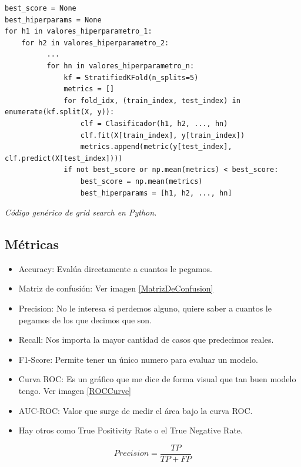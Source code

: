 \documentclass[titlepage,a4paper]{article}
\begin{document}
\begin{verbatim}
best_score = None
best_hiperparams = None
for h1 in valores_hiperparametro_1:
    for h2 in valores_hiperparametro_2:
          ...
          for hn in valores_hiperparametro_n:
              kf = StratifiedKFold(n_splits=5)
              metrics = []
              for fold_idx, (train_index, test_index) in enumerate(kf.split(X, y)):
                  clf = Clasificador(h1, h2, ..., hn)
                  clf.fit(X[train_index], y[train_index])
                  metrics.append(metric(y[test_index], clf.predict(X[test_index])))
              if not best_score or np.mean(metrics) < best_score:
                  best_score = np.mean(metrics)
                  best_hiperparams = [h1, h2, ..., hn]
\end{verbatim}
\begin{center}
   \textit{Código genérico de grid search en Python.}
\end{center}





\subsection{Métricas}
\begin{itemize}
    \item Accuracy: Evalúa directamente a cuantos le pegamos.
    \item Matriz de confusión: Ver imagen \ref{MatrizDeConfusion}
    \item Precision: No le interesa si perdemos alguno, quiere saber a cuantos le pegamos de los que decimos que son. 
    \item Recall: Nos importa la mayor cantidad de casos que predecimos reales.
    \item F1-Score: Permite tener un único numero para evaluar un modelo.
    \item Curva ROC: Es un gráfico que me dice de forma visual que tan buen modelo tengo. Ver imagen \ref{ROCCurve}
    \item AUC-ROC: Valor que surge de medir el área bajo la curva ROC.
    \item Hay otros como True Positivity Rate o el True Negative Rate.
\end{itemize}

\begin{equation}
    Precision = \frac{TP}{TP+FP}
\end{equation}
\end{document}
